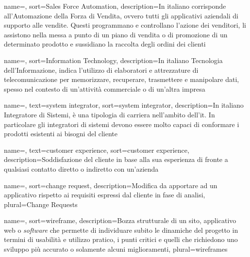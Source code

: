 
{
    name=,
    sort=Sales Force Automation,
    description={In italiano corrisponde all'Automazione della Forza di Vendita, ovvero tutti gli applicativi aziendali di supporto alle vendite. Questi programmano e controllano l'azione dei venditori, li assistono nella messa a punto di un piano di vendita o di promozione di un determinato prodotto e sussidiano la raccolta degli ordini dei clienti}
}

{
    name=,
    sort=Information Technology,
    description={In italiano Tecnologia dell'Informazione, indica l'utilizzo di elaboratori e attrezzature di telecomunicazione per memorizzare, recuperare, trasmettere
e manipolare dati, spesso nel contesto di un'attività commerciale o di un'altra
impresa}
}

{
    name=,
    text=system integrator,
    sort=system integrator,
    description={In italiano Integratore di Sistemi, è una tipologia di carriera nell'ambito dell'\gls{it}. In particolare gli integratori di sistemi devono essere molto capaci di conformare i prodotti esistenti ai bisogni del cliente}
}

{
    name=,
    text=customer experience,
    sort=customer experience,
    description={Soddisfazione del cliente in base alla sua esperienza di fronte a qualsiasi contatto diretto o indiretto con un'azienda}
}

{
    name=,
    sort=change request,
    description={Modifica da apportare ad un applicativo rispetto ai requisiti espressi dal cliente in fase di analisi},
    plural=Change Requests
}

{
    name=,
    sort=wireframe,
    description={Bozza strutturale di un sito, applicativo web o \textit{software} che permette di individuare subito le dinamiche del progetto in termini di usabilità e utilizzo pratico, i punti critici e quelli che richiedono uno sviluppo più accurato o solamente alcuni miglioramenti},
    plural=wireframes
}

